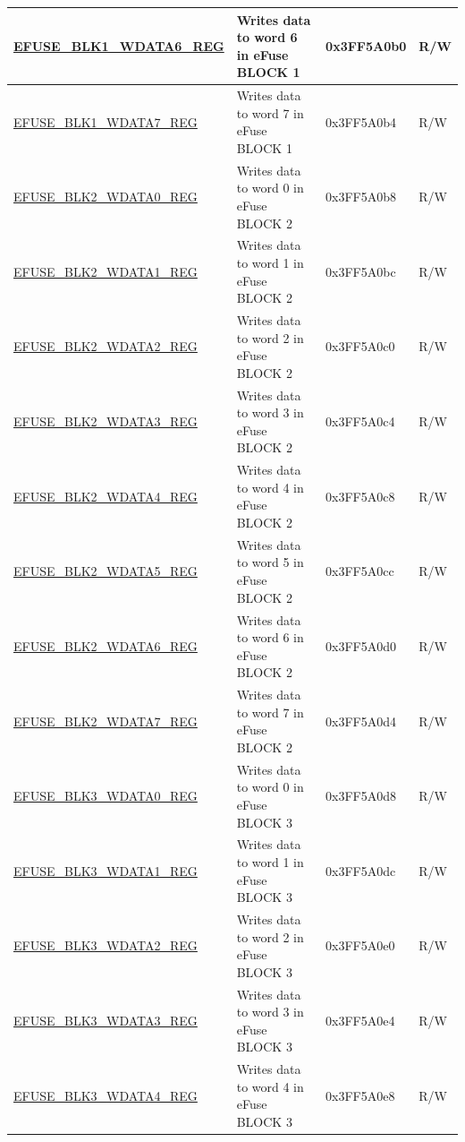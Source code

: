 \begin{longtable}{ | p{5cm} | p{7.5cm} | p{2cm} | p{1cm} | }
\hyperref[regdesc:EFUSEBLK1WDATAnREG]{EFUSE\_BLK1\_WDATA6\_REG} & Writes data to word 6 in eFuse BLOCK 1 & 0x3FF5A0b0 & R/W \\ \hline
\hyperref[regdesc:EFUSEBLK1WDATAnREG]{EFUSE\_BLK1\_WDATA7\_REG} & Writes data to word 7 in eFuse BLOCK 1 & 0x3FF5A0b4 & R/W \\ \hline
\hyperref[regdesc:EFUSEBLK2WDATAnREG]{EFUSE\_BLK2\_WDATA0\_REG} & Writes data to word 0 in eFuse BLOCK 2 & 0x3FF5A0b8 & R/W \\ \hline
\hyperref[regdesc:EFUSEBLK2WDATAnREG]{EFUSE\_BLK2\_WDATA1\_REG} & Writes data to word 1 in eFuse BLOCK 2 & 0x3FF5A0bc & R/W \\ \hline
\hyperref[regdesc:EFUSEBLK2WDATAnREG]{EFUSE\_BLK2\_WDATA2\_REG} & Writes data to word 2 in eFuse BLOCK 2 & 0x3FF5A0c0 & R/W \\ \hline
\hyperref[regdesc:EFUSEBLK2WDATAnREG]{EFUSE\_BLK2\_WDATA3\_REG} & Writes data to word 3 in eFuse BLOCK 2 & 0x3FF5A0c4 & R/W \\ \hline
\hyperref[regdesc:EFUSEBLK2WDATAnREG]{EFUSE\_BLK2\_WDATA4\_REG} & Writes data to word 4 in eFuse BLOCK 2 & 0x3FF5A0c8 & R/W \\ \hline
\hyperref[regdesc:EFUSEBLK2WDATAnREG]{EFUSE\_BLK2\_WDATA5\_REG} & Writes data to word 5 in eFuse BLOCK 2 & 0x3FF5A0cc & R/W \\ \hline
\hyperref[regdesc:EFUSEBLK2WDATAnREG]{EFUSE\_BLK2\_WDATA6\_REG} & Writes data to word 6 in eFuse BLOCK 2 & 0x3FF5A0d0 & R/W \\ \hline
\hyperref[regdesc:EFUSEBLK2WDATAnREG]{EFUSE\_BLK2\_WDATA7\_REG} & Writes data to word 7 in eFuse BLOCK 2 & 0x3FF5A0d4 & R/W \\ \hline
\hyperref[regdesc:EFUSEBLK3WDATAnREG]{EFUSE\_BLK3\_WDATA0\_REG} & Writes data to word 0 in eFuse BLOCK 3 & 0x3FF5A0d8 & R/W \\ \hline
\hyperref[regdesc:EFUSEBLK3WDATAnREG]{EFUSE\_BLK3\_WDATA1\_REG} & Writes data to word 1 in eFuse BLOCK 3 & 0x3FF5A0dc & R/W \\ \hline
\hyperref[regdesc:EFUSEBLK3WDATAnREG]{EFUSE\_BLK3\_WDATA2\_REG} & Writes data to word 2 in eFuse BLOCK 3 & 0x3FF5A0e0 & R/W \\ \hline
\hyperref[regdesc:EFUSEBLK3WDATAnREG]{EFUSE\_BLK3\_WDATA3\_REG} & Writes data to word 3 in eFuse BLOCK 3 & 0x3FF5A0e4 & R/W \\ \hline
\hyperref[regdesc:EFUSEBLK3WDATAnREG]{EFUSE\_BLK3\_WDATA4\_REG} & Writes data to word 4 in eFuse BLOCK 3 & 0x3FF5A0e8 & R/W \\ \hline

\end{longtable}
